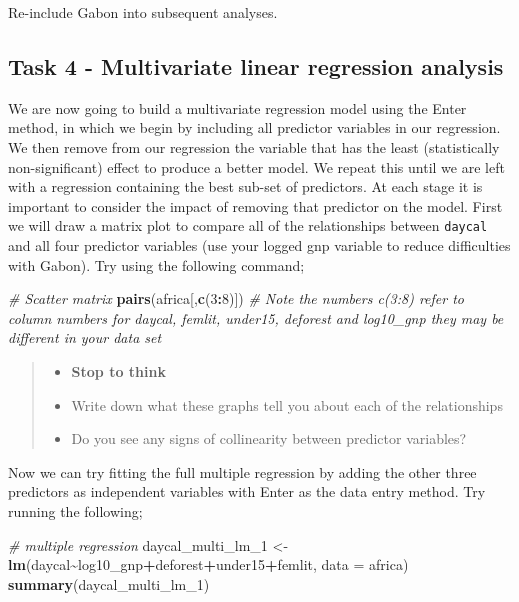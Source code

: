 \documentclass[
]{book}
\newenvironment{Shaded}{\begin{snugshade}}{\end{snugshade}}
\newcommand{\AttributeTok}[1]{\textcolor[rgb]{0.13,0.29,0.53}{#1}}
\newcommand{\CommentTok}[1]{\textcolor[rgb]{0.56,0.35,0.01}{\textit{#1}}}
\newcommand{\DecValTok}[1]{\textcolor[rgb]{0.00,0.00,0.81}{#1}}
\newcommand{\FunctionTok}[1]{\textcolor[rgb]{0.13,0.29,0.53}{\textbf{#1}}}
\newcommand{\NormalTok}[1]{#1}
\newcommand{\OtherTok}[1]{\textcolor[rgb]{0.56,0.35,0.01}{#1}}
\newcommand{\SpecialCharTok}[1]{\textcolor[rgb]{0.81,0.36,0.00}{\textbf{#1}}}
\providecommand{\tightlist}{%
  \setlength{\itemsep}{0pt}\setlength{\parskip}{0pt}}
\begin{document}
Re-include Gabon into subsequent analyses.

\subsection{Task 4 - Multivariate linear regression analysis}\label{c11t4}

We are now going to build a multivariate regression model using the Enter method, in which we begin by including all predictor variables in our regression. We then remove from our regression the variable that has the least (statistically non-significant) effect to produce a better model. We repeat this until we are left with a regression containing the best sub-set of predictors. At each stage it is important to consider the impact of removing that predictor on the model.
First we will draw a matrix plot to compare all of the relationships between \texttt{daycal} and all four predictor variables (use your logged gnp variable to reduce difficulties with Gabon). Try using the following command;

\begin{Shaded}
\begin{Highlighting}[]
\CommentTok{\# Scatter matrix}
\FunctionTok{pairs}\NormalTok{(africa[,}\FunctionTok{c}\NormalTok{(}\DecValTok{3}\SpecialCharTok{:}\DecValTok{8}\NormalTok{)])}
\CommentTok{\# Note the numbers c(3:8) refer to column numbers for daycal, femlit, under15, deforest and log10\_gnp they may be different in your data set}
\end{Highlighting}
\end{Shaded}

\begin{quote}
\begin{itemize}
\tightlist
\item
  \textbf{Stop to think}
\item
  Write down what these graphs tell you about each of the relationships
\item
  Do you see any signs of collinearity between predictor variables?
\end{itemize}
\end{quote}

Now we can try fitting the full multiple regression by adding the other three predictors as independent variables with Enter as the data entry method. Try running the following;

\begin{Shaded}
\begin{Highlighting}[]
\CommentTok{\# multiple regression}
\NormalTok{daycal\_multi\_lm\_1 }\OtherTok{\textless{}{-}} \FunctionTok{lm}\NormalTok{(daycal}\SpecialCharTok{\textasciitilde{}}\NormalTok{log10\_gnp}\SpecialCharTok{+}\NormalTok{deforest}\SpecialCharTok{+}\NormalTok{under15}\SpecialCharTok{+}\NormalTok{femlit, }\AttributeTok{data =}\NormalTok{ africa)}
\FunctionTok{summary}\NormalTok{(daycal\_multi\_lm\_1)}
\end{Highlighting}
\end{Shaded}
\end{document}
